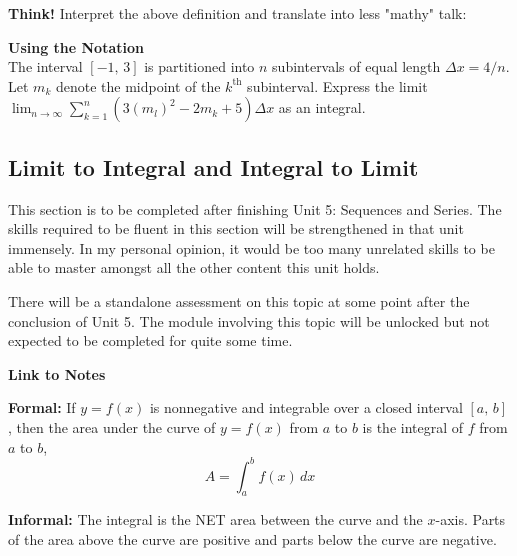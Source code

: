 \documentclass[addpoints, 12pt]{exam}
\begin{document}
\noindent\textbf{Think!} Interpret the above definition and translate into less "mathy" talk:


\textbf{Using the Notation}\\
The interval $[-1,\,3]$ is partitioned into $n$ subintervals of equal length $\Delta x=4/n$. Let $m_k$ denote the midpoint of the $k^{\text{th}}$ subinterval. Express the limit $\displaystyle\lim_{n\to\infty}\sum_{k=1}^n \left( 3\left(m_l\right)^2-2m_k +5 \right)\Delta x$ as an integral.

\newpage

\subsection*{Limit to Integral and Integral to Limit}
This section is to be completed after finishing Unit 5: Sequences and Series. The skills required to be fluent in this section will be strengthened in that unit immensely. In my personal opinion, it would be too many unrelated skills to be able to master amongst all the other content this unit holds.

There will be a standalone assessment on this topic at some point after the conclusion of Unit 5. The module involving this topic will be unlocked but not expected to be completed for quite some time.

\begin{center}
    \hspace{0pt}
    \vfill
    \textbf{Link to Notes}
    \vspace{.7cm}
    
    \vfill
    \hspace{0pt}
\end{center}

\newpage

\begin{tcolorbox}[title= DEFINITION OF THE DEFINITE INTEGRAL, black,sharp corners,colback=white,colbacktitle=white,coltitle=black,boxrule=1pt]

     \textbf{Formal:} If $y=f(x)$ is nonnegative and integrable over a closed interval $[a,\,b]$, then the area under the curve of $y=f(x)$ from $a$ to $b$ is the integral of $f$ from $a$ to $b$,
     \[A=\int_a^b f(x)\,dx\]
     
     \textbf{Informal:} The integral is the NET area between the curve and the $x$-axis. Parts of the area above the curve are positive and parts below the curve are negative.
    
\end{tcolorbox}
\end{document}
